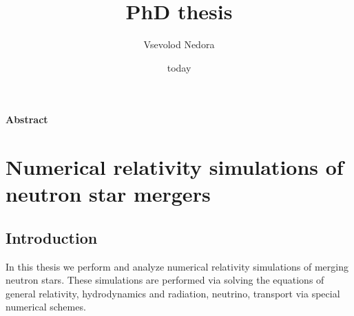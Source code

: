 \documentclass[11pt,a4paper,headinclude=true,DIV=14,BCOR=8mm,chapterprefix,listof=totoc,twoside,openright,abstracton]{scrbook}
\title{PhD thesis}
\author{Vsevolod Nedora}
\date{today}
\begin{document}
\maketitle

\mainmatter



\begin{center}
    \textbf{Abstract} \\[1cm]
\end{center}


\part{Numerical relativity simulations of neutron star mergers}

\chapter{Introduction}

In this thesis we perform and analyze numerical relativity simulations of merging neutron stars. 
These simulations are performed via solving the equations of general relativity, hydrodynamics and radiation, neutrino, transport via special numerical schemes. 
\end{document}
